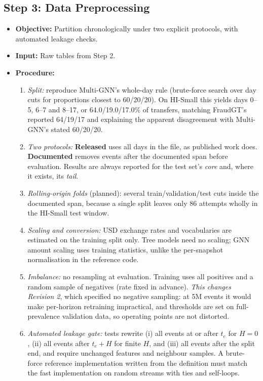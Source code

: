 \documentclass[11pt,a4paper]{article}
\begin{document}
\subsection{Step 3: Data Preprocessing}
\begin{itemize}[leftmargin=*]
    \item \textbf{Objective:} Partition chronologically under two explicit protocols, with automated leakage checks.
    \item \textbf{Input:} Raw tables from Step 2.
    \item \textbf{Procedure:}
    \begin{enumerate}[leftmargin=*]
        \item \textit{Split:} reproduce Multi-GNN's whole-day rule (brute-force search over day cuts for proportions closest to 60/20/20). On HI-Small this yields days 0--5, 6--7 and 8--17, or 64.0/19.0/17.0\% of transfers, matching FraudGT's reported 64/19/17 and explaining the apparent disagreement with Multi-GNN's stated 60/20/20.
        \item \textit{Two protocols:} \textbf{Released} uses all days in the file, as published work does. \textbf{Documented} removes events after the documented span before evaluation. Results are always reported for the test set's \emph{core} and, where it exists, its \emph{tail}.
        \item \textit{Rolling-origin folds} (planned): several train/validation/test cuts inside the documented span, because a single split leaves only 86 attempts wholly in the HI-Small test window.
        \item \textit{Scaling and conversion:} USD exchange rates and vocabularies are estimated on the training split only. Tree models need no scaling; GNN amount scaling uses training statistics, unlike the per-snapshot normalisation in the reference code.
        \item \textit{Imbalance:} no resampling at evaluation. Training uses all positives and a random sample of negatives (rate fixed in advance). \emph{This changes Revision 2}, which specified no negative sampling: at 5M events it would make per-horizon retraining impractical, and thresholds are set on full-prevalence validation data, so operating points are not distorted.
        \item \textit{Automated leakage gate:} tests rewrite (i) all events at or after $t_e$ for $H=0$, (ii) all events after $t_e+H$ for finite $H$, and (iii) all events after the split end, and require unchanged features and neighbour samples. A brute-force reference implementation written from the definition must match the fast implementation on random streams with ties and self-loops.

\end{enumerate}
\end{itemize}
\end{document}
